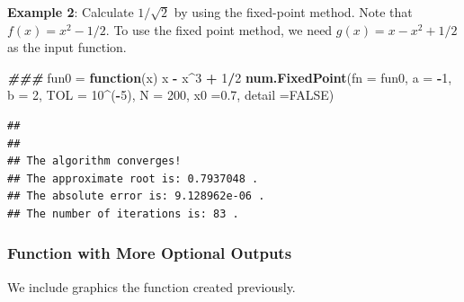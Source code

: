 \documentclass[
]{book}
\newenvironment{Shaded}{\begin{snugshade}}{\end{snugshade}}
\newcommand{\AttributeTok}[1]{\textcolor[rgb]{0.13,0.29,0.53}{#1}}
\newcommand{\ConstantTok}[1]{\textcolor[rgb]{0.56,0.35,0.01}{#1}}
\newcommand{\ControlFlowTok}[1]{\textcolor[rgb]{0.13,0.29,0.53}{\textbf{#1}}}
\newcommand{\DecValTok}[1]{\textcolor[rgb]{0.00,0.00,0.81}{#1}}
\newcommand{\DocumentationTok}[1]{\textcolor[rgb]{0.56,0.35,0.01}{\textbf{\textit{#1}}}}
\newcommand{\FloatTok}[1]{\textcolor[rgb]{0.00,0.00,0.81}{#1}}
\newcommand{\FunctionTok}[1]{\textcolor[rgb]{0.13,0.29,0.53}{\textbf{#1}}}
\newcommand{\NormalTok}[1]{#1}
\newcommand{\OtherTok}[1]{\textcolor[rgb]{0.56,0.35,0.01}{#1}}
\newcommand{\SpecialCharTok}[1]{\textcolor[rgb]{0.81,0.36,0.00}{\textbf{#1}}}
\begin{document}
\textbf{Example 2}: Calculate \(1/\sqrt{2}\) by using the fixed-point method. Note that \(f(x) = x^2 - 1/2\). To use the fixed point method, we need \(g(x) = x -x^2 +1/2\) as the input function.

\begin{Shaded}
\begin{Highlighting}[]
\DocumentationTok{\#\#\#}
\NormalTok{fun0 }\OtherTok{=} \ControlFlowTok{function}\NormalTok{(x) x }\SpecialCharTok{{-}}\NormalTok{ x}\SpecialCharTok{\^{}}\DecValTok{3} \SpecialCharTok{+} \DecValTok{1}\SpecialCharTok{/}\DecValTok{2}
\FunctionTok{num.FixedPoint}\NormalTok{(}\AttributeTok{fn =}\NormalTok{ fun0, }\AttributeTok{a =} \SpecialCharTok{{-}}\DecValTok{1}\NormalTok{, }\AttributeTok{b =} \DecValTok{2}\NormalTok{, }\AttributeTok{TOL =} \DecValTok{10}\SpecialCharTok{\^{}}\NormalTok{(}\SpecialCharTok{{-}}\DecValTok{5}\NormalTok{), }\AttributeTok{N =} \DecValTok{200}\NormalTok{, }\AttributeTok{x0 =}\FloatTok{0.7}\NormalTok{, }\AttributeTok{detail =}\ConstantTok{FALSE}\NormalTok{)}
\end{Highlighting}
\end{Shaded}

\begin{verbatim}
## 
## 
## The algorithm converges!
## The approximate root is: 0.7937048 .
## The absolute error is: 9.128962e-06 .
## The number of iterations is: 83 .
\end{verbatim}

\hypertarget{function-with-more-optional-outputs}{%
\subsubsection{Function with More Optional Outputs}\label{function-with-more-optional-outputs}}

We include graphics the function created previously.
\end{document}

